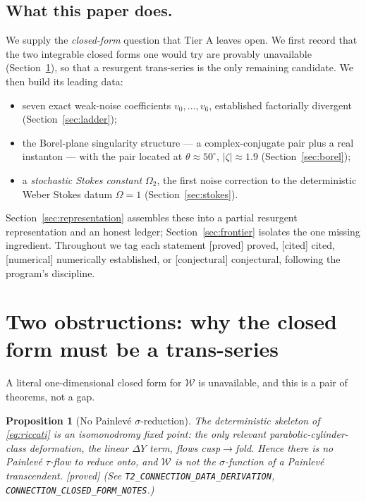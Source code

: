 \documentclass[11pt,reqno]{amsart}
\theoremstyle{plain}
\newtheorem{proposition}[theorem]{Proposition}
\theoremstyle{definition}
\theoremstyle{remark}
\newcommand{\W}{\mathcal{W}}
\newcommand{\tagP}{{\footnotesize\textsf{[proved]}}}
\newcommand{\tagC}{{\footnotesize\textsf{[cited]}}}
\newcommand{\tagN}{{\footnotesize\textsf{[numerical]}}}
\newcommand{\tagX}{{\footnotesize\textsf{[conjectural]}}}
\begin{document}
\subsection{What this paper does.}
We supply the \emph{closed-form} question that Tier A leaves open. We first record that the two
integrable closed forms one would try are provably unavailable (Section~\ref{sec:obstructions}),
so that a resurgent trans-series is the only remaining candidate. We then build its leading
data:
\begin{itemize}
\item[(i)] seven exact weak-noise coefficients $v_0,\dots,v_6$, established factorially
divergent (Section~\ref{sec:ladder});
\item[(ii)] the Borel-plane singularity structure --- a complex-conjugate pair plus a real
instanton --- with the pair located at $\theta\approx50^\circ$, $|\zeta|\approx1.9$
(Section~\ref{sec:borel});
\item[(iii)] a \emph{stochastic Stokes constant} $\Omega_2$, the first noise correction to the
deterministic Weber Stokes datum $\Omega=1$ (Section~\ref{sec:stokes}).
\end{itemize}
Section~\ref{sec:representation} assembles these into a partial resurgent representation and an
honest ledger; Section~\ref{sec:frontier} isolates the one missing ingredient. Throughout we
tag each statement \tagP{} proved, \tagC{} cited, \tagN{} numerically established, or \tagX{}
conjectural, following the program's discipline.

\section{Two obstructions: why the closed form must be a trans-series}\label{sec:obstructions}

A literal one-dimensional closed form for $\W$ is unavailable, and this is a pair of theorems,
not a gap.

\begin{proposition}[No Painlev\'e $\sigma$-reduction]\label{prop:nopainleve}
The deterministic skeleton of \eqref{eq:riccati} is an isomonodromy \emph{fixed point}: the
only relevant parabolic-cylinder-class deformation, the linear $\Delta Y$ term, flows
cusp$\to$fold. Hence there is no Painlev\'e $\tau$-flow to reduce onto, and $\W$ is not the
$\sigma$-function of a Painlev\'e transcendent. \tagP{} \emph{(See
\texttt{T2\_CONNECTION\_DATA\_DERIVATION}, \texttt{CONNECTION\_CLOSED\_FORM\_NOTES}.)}
\end{proposition}
\end{document}

